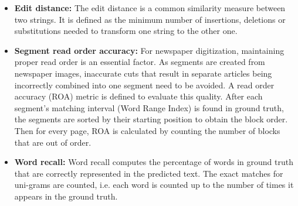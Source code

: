 \documentclass[letterpaper]{article} %
\begin{document}
\begin{itemize}
    \item \textbf{Edit distance:} The edit distance is a common similarity measure between two strings. It is defined as the minimum number of insertions, deletions or substitutions needed to transform one string to the other one.
    \item \textbf{Segment read order accuracy:} For newspaper digitization, maintaining proper read order is an essential factor. As segments are created from newspaper images, inaccurate cuts that result in separate articles being incorrectly combined into one segment need to be avoided.  A read order accuracy (ROA) metric is defined to evaluate this quality. After each segment's matching interval (Word Range Index) is found in ground truth, the segments are sorted by their starting position to obtain the block order. Then for every page, ROA is calculated by counting the number of blocks that are out of order. 
    \item \textbf{Word recall:} Word recall computes the percentage of words in ground truth that are correctly represented in the predicted text. The exact matches for uni-grams are counted, i.e.  each word is counted up to the number of times it appears in the ground truth. 
\end{itemize}
\end{document}
